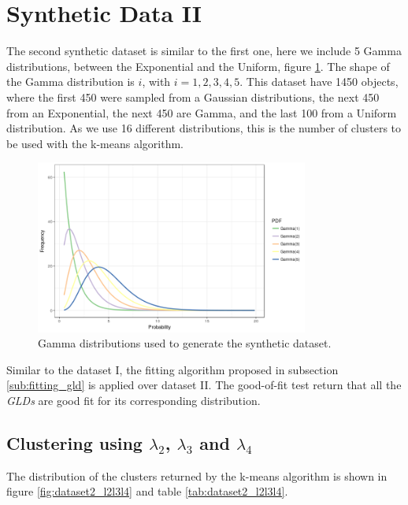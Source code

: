 \section{Synthetic Data II}\label{sec:synthetic_II}
The second synthetic dataset is similar to the first one, here we include 5 Gamma distributions, between the Exponential and the Uniform, figure \ref{fig:5_gamma}. The shape of the Gamma distribution is $i$, with $i=1, 2, 3, 4, 5$. This dataset have 1450 objects, where the first 450 were sampled from a Gaussian distributions, the next 450 from an Exponential, the next 450 are Gamma, and the last 100 from a Uniform distribution. As we use 16 different distributions, this is the number of clusters to be used with the k-means algorithm. 

\begin{figure}[H]
    \centering
    \includegraphics[width=0.8\textwidth]{img/gld_clustering/extra_images/5_gamma.png}
    \caption{Gamma distributions used to generate the synthetic dataset.}
    \label{fig:5_gamma}
\end{figure}

Similar to the dataset I, the fitting algorithm proposed in subsection \ref{sub:fitting_gld} is applied over dataset II. The good-of-fit test return that all the \textit{GLDs} are good fit for its corresponding distribution.

\subsection{Clustering using $\lambda_{2}$, $\lambda_{3}$ and $\lambda_{4}$}\label{syntheticII_l234}

The distribution of the clusters returned by the k-means algorithm is shown in figure \ref{fig:dataset2_l2l3l4} and table \ref{tab:dataset2_l2l3l4}.

